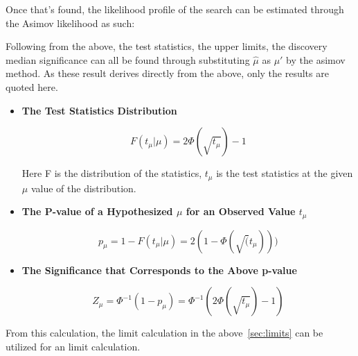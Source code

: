 Once that's found, the likelihood profile of the search can be estimated through the Asimov likelihood as such:

Following from the above, the test statistics, the upper limits, the discovery median significance can all be found through substituting $\hat{\mu}$ as $\mu'$ by the asimov method. As these result derives directly from the above, only the results are quoted here. 

\begin{itemize}
    \item \textbf{The Test Statistics Distribution}

\begin{equation}
    F(t_{\mu}| \mu) = 2\Phi(\sqrt{t_{\mu}})-1
\label{eq:teststatistics}
\end{equation}

Here F is the distribution of the statistics, $t_\mu$ is the test statistics at the given $\mu$ value of the distribution. 

\item \textbf{The P-value of a Hypothesized $\mu$ for an Observed Value $t_\mu$}

\begin{equation}
p_{\mu} = 1-F(t_{\mu}| \mu)=2(1-\Phi(\sqrt(t_{\mu})))
\end{equation}


\item \textbf{The Significance that Corresponds to the Above p-value}

\begin{equation}
Z_{\mu} = \Phi^{-1}(1-p_{\mu})  = \Phi^{-1}(2\Phi(\sqrt{t_{\mu}})-1)
\end{equation}

\end{itemize}

From this calculation, the limit calculation in the above~\ref{sec:limits} can be utilized for an limit calculation. 

%
%
%



